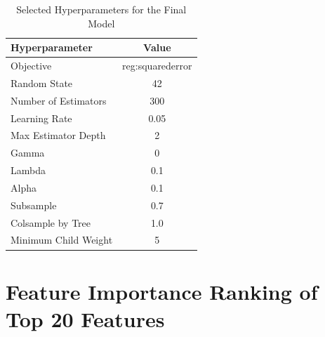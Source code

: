 \documentclass[USenglish]{article}
\theoremstyle{dgthm}
\theoremstyle{dgdef}
\begin{document}
\begin{table}[!ht]
\caption{Selected Hyperparameters for the Final Model}
\label{tab:hyperparameters}
\begin{tabular}{lc}
\toprule
Hyperparameter & Value \\
\midrule
Objective & reg:squarederror \\
Random State & 42 \\
Number of Estimators & 300 \\
Learning Rate & 0.05 \\
Max Estimator Depth & 2 \\
Gamma & 0 \\
Lambda & 0.1 \\
Alpha & 0.1 \\
Subsample & 0.7 \\
Colsample by Tree & 1.0 \\
Minimum Child Weight & 5 \\
\bottomrule
\end{tabular}
\end{table}

\clearpage

\section{Feature Importance Ranking of Top 20 Features}
\end{document}
